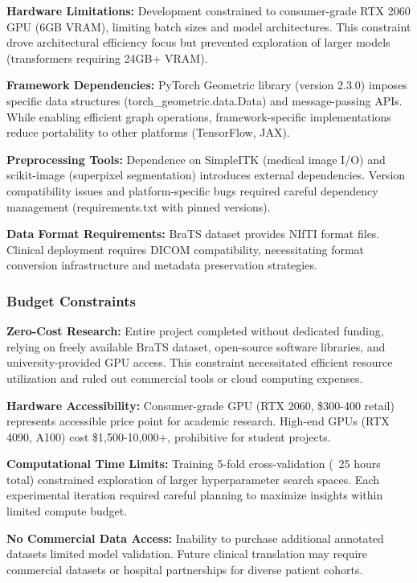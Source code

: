 \textbf{Hardware Limitations:} Development constrained to consumer-grade RTX 2060 GPU (6GB VRAM), limiting batch sizes and model architectures. This constraint drove architectural efficiency focus but prevented exploration of larger models (transformers requiring 24GB+ VRAM).

\textbf{Framework Dependencies:} PyTorch Geometric library (version 2.3.0) imposes specific data structures (torch\_geometric.data.Data) and message-passing APIs. While enabling efficient graph operations, framework-specific implementations reduce portability to other platforms (TensorFlow, JAX).

\textbf{Preprocessing Tools:} Dependence on SimpleITK (medical image I/O) and scikit-image (superpixel segmentation) introduces external dependencies. Version compatibility issues and platform-specific bugs required careful dependency management (requirements.txt with pinned versions).

\textbf{Data Format Requirements:} BraTS dataset provides NIfTI format files. Clinical deployment requires DICOM compatibility, necessitating format conversion infrastructure and metadata preservation strategies.

\subsubsection{Budget Constraints}

\textbf{Zero-Cost Research:} Entire project completed without dedicated funding, relying on freely available BraTS dataset, open-source software libraries, and university-provided GPU access. This constraint necessitated efficient resource utilization and ruled out commercial tools or cloud computing expenses.

\textbf{Hardware Accessibility:} Consumer-grade GPU (RTX 2060, \$300-400 retail) represents accessible price point for academic research. High-end GPUs (RTX 4090, A100) cost \$1,500-10,000+, prohibitive for student projects.

\textbf{Computational Time Limits:} Training 5-fold cross-validation (~25 hours total) constrained exploration of larger hyperparameter search spaces. Each experimental iteration required careful planning to maximize insights within limited compute budget.

\textbf{No Commercial Data Access:} Inability to purchase additional annotated datasets limited model validation. Future clinical translation may require commercial datasets or hospital partnerships for diverse patient cohorts.


